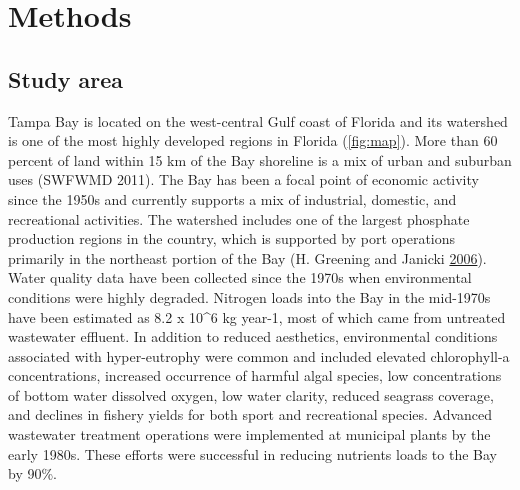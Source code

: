 \documentclass[]{article}
\begin{document}
\section{Methods}\label{methods}

\subsection{Study area}\label{study-area}

Tampa Bay is located on the west-central Gulf coast of Florida and its
watershed is one of the most highly developed regions in Florida
(\cref{fig:map}). More than 60 percent of land within 15 km of the Bay
shoreline is a mix of urban and suburban uses (SWFWMD 2011). The Bay has
been a focal point of economic activity since the 1950s and currently
supports a mix of industrial, domestic, and recreational activities. The
watershed includes one of the largest phosphate production regions in
the country, which is supported by port operations primarily in the
northeast portion of the Bay (H. Greening and Janicki
\protect\hyperlink{ref-Greening06}{2006}). Water quality data have been
collected since the 1970s when environmental conditions were highly
degraded. Nitrogen loads into the Bay in the mid-1970s have been
estimated as 8.2 x 10\^{}6 kg year-1, most of which came from untreated
wastewater effluent. In addition to reduced aesthetics, environmental
conditions associated with hyper-eutrophy were common and included
elevated chlorophyll-a concentrations, increased occurrence of harmful
algal species, low concentrations of bottom water dissolved oxygen, low
water clarity, reduced seagrass coverage, and declines in fishery yields
for both sport and recreational species. Advanced wastewater treatment
operations were implemented at municipal plants by the early 1980s.
These efforts were successful in reducing nutrients loads to the Bay by
90\%.
\end{document}
